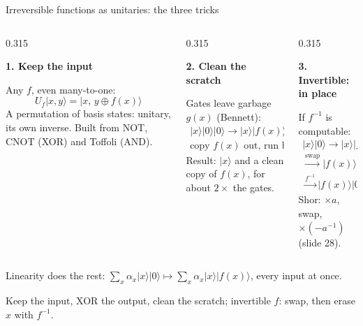 \documentclass[aspectratio=169,11pt]{beamer}
\newcommand{\blocktitle}[1]{{\bfseries #1}\par\vskip1mm}
\begin{document}
{
\begin{frame}[noframenumbering]{Irreversible functions as unitaries: the three tricks}
  \begin{columns}[T,onlytextwidth]
    \begin{column}{0.315\textwidth}
      \begin{panel}[equal height group=rv]
        \blocktitle{1. Keep the input}
        \footnotesize\setlength{\abovedisplayskip}{2pt}\setlength{\belowdisplayskip}{2pt}%
        Any $f$, even many-to-one:
        \[ U_f|x,y\rangle=|x,\,y\oplus f(x)\rangle \]
        A permutation of basis states: unitary, its own inverse. Built from NOT, CNOT (XOR) and Toffoli (AND).
      \end{panel}
    \end{column}
    \begin{column}{0.315\textwidth}
      \begin{panel}[equal height group=rv]
        \blocktitle{2. Clean the scratch}
        \footnotesize\setlength{\abovedisplayskip}{2pt}\setlength{\belowdisplayskip}{2pt}%
        Gates leave garbage $g(x)$ (Bennett):
        \[ \begin{gathered} |x\rangle|0\rangle|0\rangle \to |x\rangle|f(x)\rangle|g(x)\rangle\\ \text{copy } f(x) \text{ out, run backwards} \end{gathered} \]
        Result: $|x\rangle$ and a clean copy of $f(x)$, for about $2\times$ the gates.
      \end{panel}
    \end{column}
    \begin{column}{0.315\textwidth}
      \begin{panel}[equal height group=rv]
        \blocktitle{3. Invertible: in place}
        \footnotesize\setlength{\abovedisplayskip}{2pt}\setlength{\belowdisplayskip}{2pt}%
        If $f^{-1}$ is computable:
        \[ \begin{gathered} |x\rangle|0\rangle\to|x\rangle|f(x)\rangle\\ \xrightarrow{\text{swap}}|f(x)\rangle|x\rangle\\ \xrightarrow{f^{-1}}|f(x)\rangle|0\rangle \end{gathered} \]
        Shor: $\times a$, swap, $\times(-a^{-1})$ (slide 28).
      \end{panel}
    \end{column}
  \end{columns}
  \vskip0.5mm
  {\small Linearity does the rest: $\sum_x\alpha_x|x\rangle|0\rangle\mapsto\sum_x\alpha_x|x\rangle|f(x)\rangle$, every input at once.}
  \begin{takeaway}Keep the input, XOR the output, clean the scratch; invertible $f$: swap, then erase $x$ with $f^{-1}$.\end{takeaway}
\end{frame}}
\end{document}
